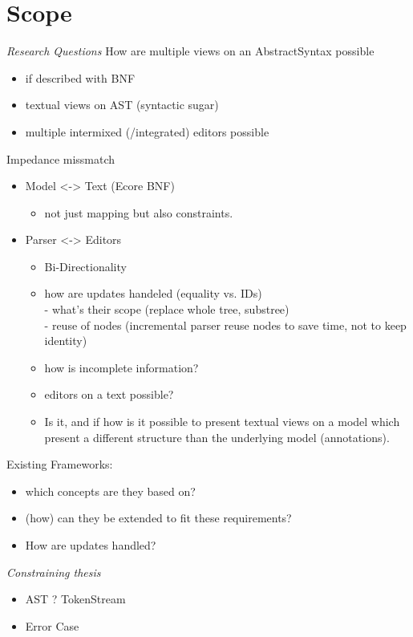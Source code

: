 \section{Scope}
\emph{Research Questions}
How are multiple views on an AbstractSyntax possible
\begin{itemize}
	\item if described with BNF
	\item textual views on AST (syntactic sugar)
	\item multiple intermixed (/integrated) editors possible
\end{itemize}
Impedance missmatch
\begin{itemize}
	\item  Model <-> Text (Ecore BNF)
	\begin{itemize}
		\item not just mapping but also constraints.
	\end{itemize}
	\item Parser <-> Editors
	\begin{itemize}
		\item Bi-Directionality
		\item how are updates handeled (equality vs. IDs) \\
		- what's their scope (replace whole tree, substree) \\
		-	reuse of nodes (incremental parser reuse nodes to save time, not to keep identity)
		\item how is incomplete information?
		\item editors on a text possible?
		\item Is it, and if how is it possible to present textual views on a model which present a different structure than the underlying model (annotations).
	\end{itemize}
\end{itemize}
Existing Frameworks:
\begin{itemize}
	\item  which concepts are they based on?
	\item  (how) can they be extended to fit these requirements?
	\item  How are updates handled?
\end{itemize}

\emph{Constraining thesis}
\begin{itemize}
	\item  AST ? TokenStream
	\item  Error Case
\end{itemize}


